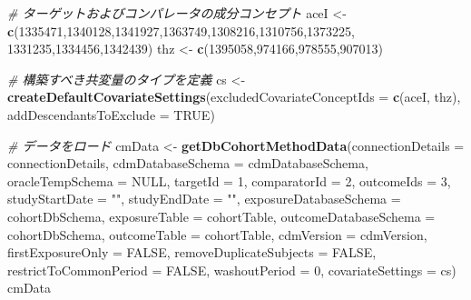 \documentclass[
  11pt]{book}
\newenvironment{Shaded}{\begin{snugshade}}{\end{snugshade}}
\newcommand{\AttributeTok}[1]{\textcolor[rgb]{0.13,0.29,0.53}{#1}}
\newcommand{\CommentTok}[1]{\textcolor[rgb]{0.56,0.35,0.01}{\textit{#1}}}
\newcommand{\ConstantTok}[1]{\textcolor[rgb]{0.56,0.35,0.01}{#1}}
\newcommand{\DecValTok}[1]{\textcolor[rgb]{0.00,0.00,0.81}{#1}}
\newcommand{\FunctionTok}[1]{\textcolor[rgb]{0.13,0.29,0.53}{\textbf{#1}}}
\newcommand{\NormalTok}[1]{#1}
\newcommand{\OtherTok}[1]{\textcolor[rgb]{0.56,0.35,0.01}{#1}}
\newcommand{\StringTok}[1]{\textcolor[rgb]{0.31,0.60,0.02}{#1}}
\theoremstyle{definition}
\theoremstyle{definition}
\theoremstyle{definition}
\theoremstyle{definition}
\theoremstyle{remark}
\begin{document}
\begin{Shaded}
\begin{Highlighting}[]
\CommentTok{\# ターゲットおよびコンパレータの成分コンセプト}
\NormalTok{aceI }\OtherTok{\textless{}{-}} \FunctionTok{c}\NormalTok{(}\DecValTok{1335471}\NormalTok{,}\DecValTok{1340128}\NormalTok{,}\DecValTok{1341927}\NormalTok{,}\DecValTok{1363749}\NormalTok{,}\DecValTok{1308216}\NormalTok{,}\DecValTok{1310756}\NormalTok{,}\DecValTok{1373225}\NormalTok{,}
          \DecValTok{1331235}\NormalTok{,}\DecValTok{1334456}\NormalTok{,}\DecValTok{1342439}\NormalTok{)}
\NormalTok{thz }\OtherTok{\textless{}{-}} \FunctionTok{c}\NormalTok{(}\DecValTok{1395058}\NormalTok{,}\DecValTok{974166}\NormalTok{,}\DecValTok{978555}\NormalTok{,}\DecValTok{907013}\NormalTok{)}

\CommentTok{\# 構築すべき共変量のタイプを定義}
\NormalTok{cs }\OtherTok{\textless{}{-}} \FunctionTok{createDefaultCovariateSettings}\NormalTok{(}\AttributeTok{excludedCovariateConceptIds =} \FunctionTok{c}\NormalTok{(aceI,}
\NormalTok{                                                                     thz),}
                                     \AttributeTok{addDescendantsToExclude =} \ConstantTok{TRUE}\NormalTok{)}

\CommentTok{\# データをロード}
\NormalTok{cmData }\OtherTok{\textless{}{-}} \FunctionTok{getDbCohortMethodData}\NormalTok{(}\AttributeTok{connectionDetails =}\NormalTok{ connectionDetails,}
                                \AttributeTok{cdmDatabaseSchema =}\NormalTok{ cdmDatabaseSchema,}
                                \AttributeTok{oracleTempSchema =} \ConstantTok{NULL}\NormalTok{,}
                                \AttributeTok{targetId =} \DecValTok{1}\NormalTok{,}
                                \AttributeTok{comparatorId =} \DecValTok{2}\NormalTok{,}
                                \AttributeTok{outcomeIds =} \DecValTok{3}\NormalTok{,}
                                \AttributeTok{studyStartDate =} \StringTok{""}\NormalTok{,}
                                \AttributeTok{studyEndDate =} \StringTok{""}\NormalTok{,}
                                \AttributeTok{exposureDatabaseSchema =}\NormalTok{ cohortDbSchema,}
                                \AttributeTok{exposureTable =}\NormalTok{ cohortTable,}
                                \AttributeTok{outcomeDatabaseSchema =}\NormalTok{ cohortDbSchema,}
                                \AttributeTok{outcomeTable =}\NormalTok{ cohortTable,}
                                \AttributeTok{cdmVersion =}\NormalTok{ cdmVersion,}
                                \AttributeTok{firstExposureOnly =} \ConstantTok{FALSE}\NormalTok{,}
                                \AttributeTok{removeDuplicateSubjects =} \ConstantTok{FALSE}\NormalTok{,}
                                \AttributeTok{restrictToCommonPeriod =} \ConstantTok{FALSE}\NormalTok{,}
                                \AttributeTok{washoutPeriod =} \DecValTok{0}\NormalTok{,}
                                \AttributeTok{covariateSettings =}\NormalTok{ cs)}
\NormalTok{cmData}
\end{Highlighting}
\end{Shaded}
\end{document}
